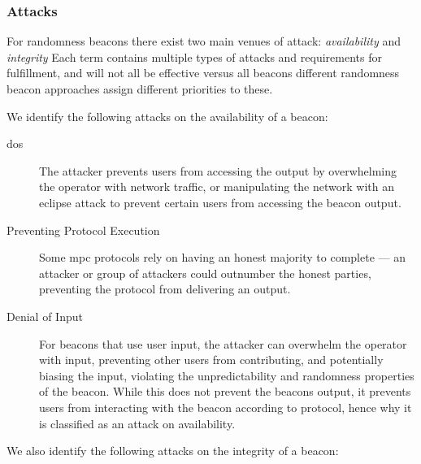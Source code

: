 \subsubsection{Attacks}\label{ssub:security_objectives}
For randomness beacons there exist two main venues of attack: \emph{availability} and \emph{integrity}
Each term contains multiple types of attacks and requirements for fulfillment, and will not all be effective versus all beacons different randomness beacon approaches assign different priorities to these.

We identify the following attacks on the availability of a beacon:

\begin{description}
    \item[\Acrfull{dos}] The attacker prevents users from accessing the output by overwhelming the operator with network traffic, or manipulating the network with an eclipse attack to prevent certain users from accessing the beacon output.
    \item[Preventing Protocol Execution] Some \gls{mpc} protocols rely on having an honest majority to complete --- an attacker or group of attackers could outnumber the honest parties, preventing the protocol from delivering an output.
    \item[Denial of Input] For beacons that use user input, the attacker can overwhelm the operator with input, preventing other users from contributing, and potentially biasing the input, violating the unpredictability and randomness properties of the beacon.
        While this does not prevent the beacons output, it prevents users from interacting with the beacon according to protocol, hence why it is classified as an attack on availability.
\end{description}

\noindent%
We also identify the following attacks on the integrity of a beacon:

